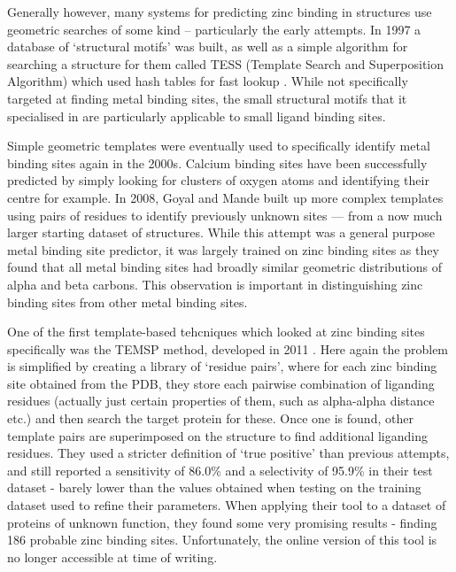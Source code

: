 Generally however, many systems for predicting zinc binding in structures use geometric searches of some kind -- particularly the early attempts. In 1997 a database of `structural motifs' was built, as well as a simple algorithm for searching a structure for them called TESS (Template Search and Superposition Algorithm) which used hash tables for fast lookup \cite{wallace1997tess}. While not specifically targeted at finding metal binding sites, the small structural motifs that it specialised in are particularly applicable to small ligand binding sites.

Simple geometric templates were eventually used to specifically identify metal binding sites again in the 2000s. Calcium binding sites have been successfully predicted by simply looking for clusters of oxygen atoms and identifying their centre \cite{deng2006} for example. In 2008, Goyal and Mande built up more complex templates using pairs of residues to identify previously unknown sites --- from a now much larger starting dataset of structures. While this attempt was a general purpose metal binding site predictor, it was largely trained on zinc binding sites as they found that all metal binding sites had broadly similar geometric distributions of alpha and beta carbons. This observation is important in distinguishing zinc binding sites from other metal binding sites.

One of the first template-based tehcniques which looked at zinc binding sites specifically was the TEMSP method, developed in 2011 \cite{zhao2011structure}. Here again the problem is simplified by creating a library of `residue pairs', where for each zinc binding site obtained from the PDB, they store each pairwise combination of liganding residues (actually just certain properties of them, such as alpha-alpha distance etc.) and then search the target protein for these. Once one is found, other template pairs are superimposed on the structure to find additional liganding residues. They used a stricter definition of `true positive' than previous attempts, and still reported a sensitivity of 86.0\% and a selectivity of 95.9\% in their test dataset - barely lower than the values obtained when testing on the training dataset used to refine their parameters. When applying their tool to a dataset of proteins of unknown function, they found some very promising results - finding 186 probable zinc binding sites.  Unfortunately, the online version of this tool is no longer accessible at time of writing.

